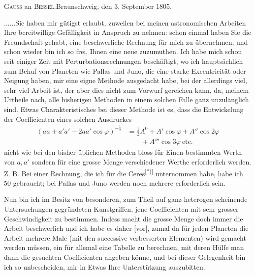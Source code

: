 \begingroup
{}
\begin{center}\textsc{Gauss} an \textsc{Bessel}.\quad Braunschweig, den 3. September 1805.\end{center}
\noindent .\quad .\quad .\quad .\quad .\quad .\quad Sie haben mir gütigst erlaubt, zuweilen bei meinen astronomischen Arbeiten Ihre bereitwillige Gefälligkeit in Anspruch zu nehmen: schon einmal haben Sie die Freundschaft gehabt, eine beschwerliche Rechnung für mich zu übernehmen, und schon wieder bin ich so frei, Ihnen eine neue zuzumuthen. Ich habe mich schon seit einiger Zeit mit Perturbationsrechnungen beschäftigt, wo ich hauptsächlich zum Behuf von Planeten wie Pallas und Juno, die eine starke Excentricität oder Neigung haben, mir eine eigne Methode ausgedacht habe, bei der allerdings viel, sehr viel Arbeit ist, der aber dies nicht zum Vorwurf gereichen kann, da, meinem Urtheile nach, alle bisherigen Methoden in einem solchen Falle ganz unzulänglich sind. Etwas Charakteristisches bei dieser Methode ist es, dass die Entwickelung
\clearpage
{}
\noindent der Coefficienten eines solchen Ausdruckes
\[
\begin{aligned}
(aa+a'a'-2aa'\cos\varphi)^{-\frac12}
&=\tfrac12 A^0+A'\cos\varphi+A''\cos2\varphi\\
&\qquad{}+A'''\cos3\varphi\ \text{etc.}
\end{aligned}
\]
\noindent nicht wie bei den bisher üblichen Methoden bloss für Einen bestimmten Werth von $a,a'$ sondern für eine grosse Menge verschiedener Werthe erforderlich werden. Z. B. Bei einer Rechnung, die ich für die Ceres\textsuperscript{[*)]} unternommen habe, habe ich 50 gebraucht; bei Pallas und Juno werden noch mehrere erforderlich sein.

\par\indent Nun bin ich im Besitz von besonderen, zum Theil auf ganz heterogen scheinende Untersuchungen gegründeten Kunstgriffen, jene Coefficienten mit sehr grosser Geschwindigkeit zu bestimmen. Indess macht die grosse Menge doch immer die Arbeit beschwerlich und ich habe es daher [vor], zumal da für jeden Planeten die Arbeit mehrere Male (mit den successive verbesserten Elementen) wird gemacht werden müssen, ein für allemal eine Tabelle zu berechnen, mit deren Hülfe man dann  die gesuchten Coefficienten angeben könne, und bei dieser Gelegenheit bin ich so unbescheiden, mir in Etwas Ihre Unterstützung auszubitten.

